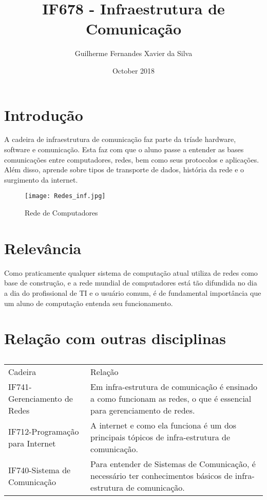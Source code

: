 \documentclass{article}
\title{IF678 - Infraestrutura de Comunicação}
\author{Guilherme Fernandes Xavier da Silva}
\date{October 2018}
\begin{document}
\maketitle

\section{Introdução}
A cadeira de infraestrutura de comunicação faz parte da tríade hardware, software e comunicação. Esta faz com que o aluno passe a entender as bases comunicações entre computadores, redes, bem como seus protocolos e aplicações. Além disso, aprende sobre tipos de transporte de dados, história da rede e o surgimento da internet.\cite{cinwiki}

\begin{figure}[h!]
\centering
\texttt{[image: Redes\_inf.jpg]}
\caption{Rede de Computadores\cite{redes}}
\label{fig:redes}
\end{figure}
\section{Relevância}
Como praticamente qualquer sistema de computação atual utiliza de redes como base de construção, e a rede mundial de computadores está tão difundida no dia a dia do profissional de TI e o usuário comum, é de fundamental importância que um aluno de computação entenda seu funcionamento.\cite{cinwiki} 

\section{Relação com outras disciplinas}
\begin{table}[h]
 \centering
 {\renewcommand\arraystretch{1.25}
 \caption{ }
 \begin{tabular}{ l l }
  \cline{1-1}\cline{2-2}  
    \multicolumn{1}{|p{3.850cm}|}{Cadeira \centering } &
    \multicolumn{1}{p{4.417cm}|}{Relação \centering }
  \\  
  \cline{1-1}\cline{2-2}  
    \multicolumn{1}{|p{3.850cm}|}{IF741-Gerenciamento de Redes} &
    \multicolumn{1}{p{4.417cm}|}{Em infra-estrutura de comunicação é ensinado a como funcionam as redes, o que é essencial para gerenciamento de redes.}
  \\  
  \cline{1-1}\cline{2-2}  
    \multicolumn{1}{|p{3.850cm}|}{IF712-Programação para Internet} &
    \multicolumn{1}{p{4.417cm}|}{A internet e como ela funciona é um dos principais tópicos de infra-estrutura de comunicação.}
  \\  
  \cline{1-1}\cline{2-2}  
    \multicolumn{1}{|p{3.850cm}|}{IF740-Sistema de Comunicação} &
    \multicolumn{1}{p{4.417cm}|}{Para entender de Sistemas de Comunicação, é necessário ter conhecimentos básicos de infra-estrutura de comunicação.}
  \\  
  \hline

 \end{tabular} }
\end{table}
\end{document}
